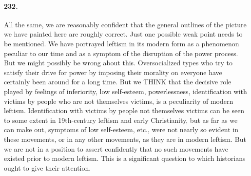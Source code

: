 \documentclass[12pt]{book}
\begin{document}
\paragraph{232.} All the same, we are reasonably confident that the general outlines of the picture we have painted here are roughly correct. Just one possible weak point needs to be mentioned. We have portrayed leftism in its modern form as a phenomenon peculiar to our time and as a symptom of the disruption of the power process. But we might possibly be wrong about this. Oversocialized types who try to satisfy their drive for power by imposing their morality on everyone have certainly been around for a long time. But we THINK that the decisive role played by feelings of inferiority, low self-esteem, powerlessness, identification with victims by people who are not themselves victims, is a peculiarity of modern leftism. Identification with victims by people not themselves victims can be seen to some extent in 19th-century leftism and early Christianity, but as far as we can make out, symptoms of low self-esteem, etc., were not nearly so evident in these movements, or in any other movements, as they are in modern leftism.  But we are not in a position to assert confidently that no such movements have existed prior to modern leftism. This is a significant question to which historians ought to give their attention.
\end{document}
